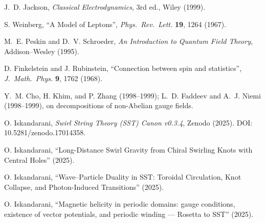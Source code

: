 \documentclass[11pt]{article}
\begin{document}
\begin{thebibliography}{99}
		J.~D. Jackson, \emph{Classical Electrodynamics}, 3rd ed., Wiley (1999).

		S. Weinberg, ``A Model of Leptons'', \emph{Phys.\ Rev.\ Lett.} \textbf{19}, 1264 (1967).

		M.~E. Peskin and D.~V. Schroeder, \emph{An Introduction to Quantum Field Theory}, Addison--Wesley (1995).

		D. Finkelstein and J. Rubinstein, ``Connection between spin and statistics'', \emph{J.\ Math.\ Phys.} \textbf{9}, 1762 (1968).

		Y.~M. Cho, H. Khim, and P. Zhang (1998--1999); L.~D. Faddeev and A.~J. Niemi (1998--1999), on decompositions of non-Abelian gauge fields.

		O. Iskandarani, \emph{Swirl String Theory (SST) Canon v0.3.4}, Zenodo (2025). DOI: 10.5281/zenodo.17014358.

		O. Iskandarani, ``Long-Distance Swirl Gravity from Chiral Swirling Knots with Central Holes'' (2025).

		O. Iskandarani, ``Wave--Particle Duality in SST: Toroidal Circulation, Knot Collapse, and Photon-Induced Transitions'' (2025).

		O. Iskandarani, ``Magnetic helicity in periodic domains: gauge conditions, existence of vector potentials, and periodic winding --- Rosetta to SST'' (2025).

	\end{thebibliography}
\end{document}
